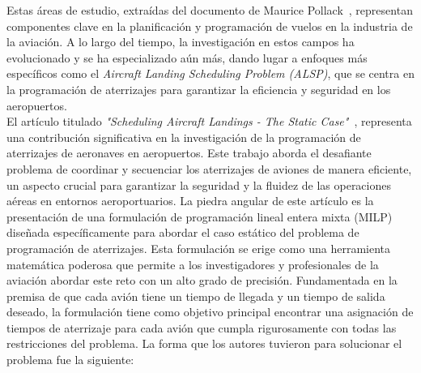 \documentclass[letter, 10pt]{article}
\begin{document}
Estas \'areas de estudio, extra\'idas del documento de Maurice Pollack~\cite{pollack1974}, representan componentes clave en la planificaci\'on y programaci\'on de vuelos en la industria de la aviaci\'on. A lo largo del tiempo, la investigaci\'on en estos campos ha evolucionado y se ha especializado a\'un m\'as, dando lugar a enfoques m\'as espec\'ificos como el \textit{Aircraft Landing Scheduling Problem (ALSP)}, que se centra en la programaci\'on de aterrizajes para garantizar la eficiencia y seguridad en los aeropuertos. \\

El art\'iculo titulado \textit{"Scheduling Aircraft Landings - The Static Case"}~\cite{beasley1990scheduling}, representa una contribuci\'on significativa en la investigaci\'on de la programaci\'on de aterrizajes de aeronaves en aeropuertos. Este trabajo aborda el desafiante problema de coordinar y secuenciar los aterrizajes de aviones de manera eficiente, un aspecto crucial para garantizar la seguridad y la fluidez de las operaciones a\'ereas en entornos aeroportuarios. La piedra angular de este art\'iculo es la presentaci\'on de una formulaci\'on de programaci\'on lineal entera mixta (MILP) dise\~{n}ada espec\'ificamente para abordar el caso est\'atico del problema de programaci\'on de aterrizajes. Esta formulaci\'on se erige como una herramienta matem\'atica poderosa que permite a los investigadores y profesionales de la aviaci\'on abordar este reto con un alto grado de precisi\'on. Fundamentada en la premisa de que cada avi\'on tiene un tiempo de llegada y un tiempo de salida deseado, la formulaci\'on tiene como objetivo principal encontrar una asignaci\'on de tiempos de aterrizaje para cada avi\'on que cumpla rigurosamente con todas las restricciones del problema. La forma que los autores tuvieron para solucionar el problema fue la siguiente:
\end{document}
